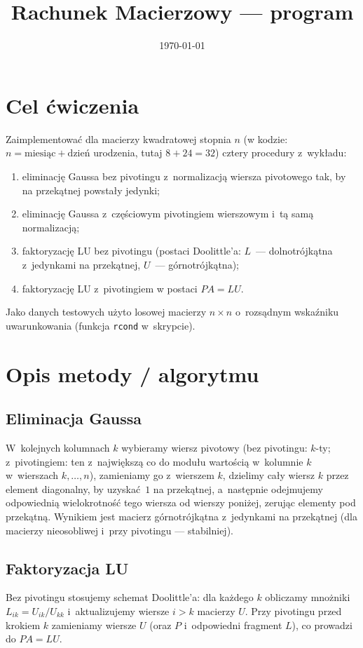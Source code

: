 \documentclass[polish]{template/projectreport}
\title{\TytulZadania\\{\large Rachunek Macierzowy --- program \NumerProgramu}}
\author{\Autorzy}
\date{\today}
\begin{document}
\maketitle

\section{Cel ćwiczenia}
Zaimplementować dla macierzy kwadratowej stopnia $n$ (w kodzie: $n = \text{miesiąc} + \text{dzień}$ urodzenia, tutaj $8+24=32$) cztery procedury z~wykładu:
\begin{enumerate}
  \item eliminację Gaussa bez pivotingu z~normalizacją wiersza pivotowego tak, by na przekątnej powstały jedynki;
  \item eliminację Gaussa z~częściowym pivotingiem wierszowym i~tą samą normalizacją;
  \item faktoryzację LU bez pivotingu (postaci Doolittle'a: $L$~--- dolnotrójkątna z~jedynkami na przekątnej, $U$~--- górnotrójkątna);
  \item faktoryzację LU z~pivotingiem w postaci $PA = LU$.
\end{enumerate}
Jako danych testowych użyto losowej macierzy $n\times n$ o~rozsądnym wskaźniku uwarunkowania (funkcja \texttt{rcond} w~skrypcie).

\section{Opis metody / algorytmu}
\subsection{Eliminacja Gaussa}
W~kolejnych kolumnach $k$ wybieramy wiersz pivotowy (bez pivotingu: $k$-ty; z~pivotingiem: ten z~największą co do modułu wartością w~kolumnie $k$ w~wierszach $k,\ldots,n$), zamieniamy go z~wierszem $k$, dzielimy cały wiersz $k$ przez element diagonalny, by uzyskać~$1$ na przekątnej, a~następnie odejmujemy odpowiednią wielokrotność tego wiersza od wierszy poniżej, zerując elementy pod przekątną. Wynikiem jest macierz górnotrójkątna z~jedynkami na przekątnej (dla macierzy nieosobliwej i~przy pivotingu --- stabilniej).

\subsection{Faktoryzacja LU}
Bez pivotingu stosujemy schemat Doolittle'a: dla każdego $k$ obliczamy mnożniki
$L_{ik} = U_{ik}/U_{kk}$ i~aktualizujemy wiersze $i>k$ macierzy $U$.
Przy pivotingu przed krokiem $k$ zamieniamy wiersze $U$ (oraz $P$ i~odpowiedni fragment $L$), co prowadzi do $PA = LU$.
\end{document}
